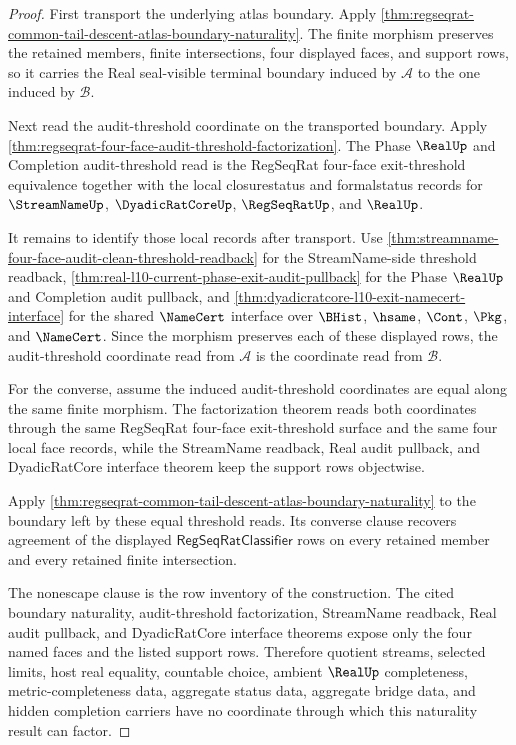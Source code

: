 \begin{proof}
First transport the underlying atlas boundary. Apply \autoref{thm:regseqrat-common-tail-descent-atlas-boundary-naturality}. The finite morphism preserves the retained members, finite intersections, four displayed faces, and support rows, so it carries the Real seal-visible terminal boundary induced by $\mathcal A$ to the one induced by $\mathcal B$.

Next read the audit-threshold coordinate on the transported boundary. Apply \autoref{thm:regseqrat-four-face-audit-threshold-factorization}. The Phase $\RealUp$ and Completion audit-threshold read is the RegSeqRat four-face exit-threshold equivalence together with the local closurestatus and formalstatus records for $\StreamNameUp$, $\DyadicRatCoreUp$, $\RegSeqRatUp$, and $\RealUp$.

It remains to identify those local records after transport. Use \autoref{thm:streamname-four-face-audit-clean-threshold-readback} for the StreamName-side threshold readback, \autoref{thm:real-l10-current-phase-exit-audit-pullback} for the Phase $\RealUp$ and Completion audit pullback, and \autoref{thm:dyadicratcore-l10-exit-namecert-interface} for the shared $\NameCert$ interface over $\BHist$, $\hsame$, $\Cont$, $\Pkg$, and $\NameCert$. Since the morphism preserves each of these displayed rows, the audit-threshold coordinate read from $\mathcal A$ is the coordinate read from $\mathcal B$.

For the converse, assume the induced audit-threshold coordinates are equal along the same finite morphism. The factorization theorem reads both coordinates through the same RegSeqRat four-face exit-threshold surface and the same four local face records, while the StreamName readback, Real audit pullback, and DyadicRatCore interface theorem keep the support rows objectwise.

Apply \autoref{thm:regseqrat-common-tail-descent-atlas-boundary-naturality} to the boundary left by these equal threshold reads. Its converse clause recovers agreement of the displayed $\mathsf{RegSeqRatClassifier}$ rows on every retained member and every retained finite intersection.

The nonescape clause is the row inventory of the construction. The cited boundary naturality, audit-threshold factorization, StreamName readback, Real audit pullback, and DyadicRatCore interface theorems expose only the four named faces and the listed support rows. Therefore quotient streams, selected limits, host real equality, countable choice, ambient $\RealUp$ completeness, metric-completeness data, aggregate status data, aggregate bridge data, and hidden completion carriers have no coordinate through which this naturality result can factor.
\end{proof}

